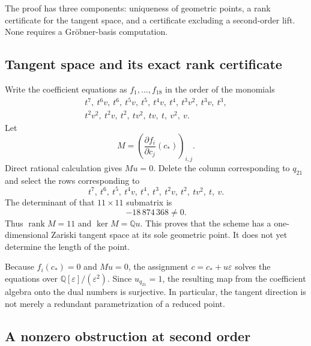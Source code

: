 \documentclass[11pt,a4paper]{article}
\numberwithin{equation}{section}
\theoremstyle{definition}
\theoremstyle{remark}
\newcommand{\Q}{\mathbb{Q}}
\newcommand{\cstar}{c_*}
\newcommand{\eps}{\varepsilon}
\begin{document}
The proof has three components: uniqueness of geometric points, a rank
certificate for the tangent space, and a certificate excluding a
second-order lift. None requires a Gr\"obner-basis computation.

\subsection{Tangent space and its exact rank certificate}

Write the coefficient equations as $f_1,\ldots,f_{18}$ in the order of the
monomials
\begin{equation}\label{eq:monomialorder}
\begin{gathered}
t^7,\ t^6v,\ t^6,\ t^5v,\ t^5,\ t^4v,\ t^4,\ t^3v^2,\ t^3v,\ t^3,\\
t^2v^2,\ t^2v,\ t^2,\ tv^2,\ tv,\ t,\ v^2,\ v.
\end{gathered}
\end{equation}
Let
\begin{equation}\label{eq:M}
M=\left(\frac{\partial f_i}{\partial c_j}(\cstar)\right)_{i,j}.
\end{equation}
Direct rational calculation gives $Mu=0$. Delete the column corresponding
to $q_{21}$ and select the rows corresponding to
\begin{equation}\label{eq:minorrowmonomials}
t^7,\ t^6,\ t^5,\ t^4v,\ t^4,\ t^3,\ t^2v,\ t^2,\ tv^2,\ t,\ v.
\end{equation}
The determinant of that $11\times11$ submatrix is
\begin{equation}\label{eq:minorvalue}
-18\,874\,368\ne0.
\end{equation}
Thus $\operatorname{rank}M=11$ and $\ker M=\Q u$. This proves that the
scheme has a one-dimensional Zariski tangent space at its sole geometric
point. It does not yet determine the length of the point.

Because $f_i(\cstar)=0$ and $Mu=0$, the assignment
$c=\cstar+u\eps$ solves the equations over $\Q[\eps]/(\eps^2)$.
Since $u_{q_{21}}=1$, the resulting map from the coefficient algebra onto
the dual numbers is surjective. In particular, the tangent direction is
not merely a redundant parametrization of a reduced point.

\subsection{A nonzero obstruction at second order}
\end{document}
